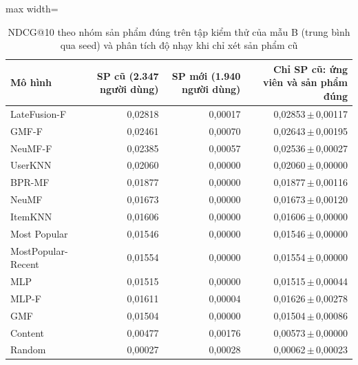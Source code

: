\begin{table}[htbp]
    \centering\small
    \caption{NDCG@10 theo nhóm sản phẩm đúng trên tập kiểm thử của mẫu B (trung bình qua seed) và phân tích độ nhạy khi chỉ xét sản phẩm cũ}
    \label{tab:v2groups}
    \begin{adjustbox}{max width=\textwidth}
    \begin{tabular}{lrrr}
        \toprule
        Mô hình & SP cũ (2.347 người dùng) & SP mới (1.940 người dùng) & Chỉ SP cũ: ứng viên và sản phẩm đúng \\
        \midrule
        LateFusion-F & 0{,}02818 & 0{,}00017 & 0{,}02853\,{\scriptsize$\pm$\,0{,}00117} \\
        GMF-F & 0{,}02461 & 0{,}00070 & 0{,}02643\,{\scriptsize$\pm$\,0{,}00195} \\
        NeuMF-F & 0{,}02385 & 0{,}00057 & 0{,}02536\,{\scriptsize$\pm$\,0{,}00027} \\
        UserKNN & 0{,}02060 & 0{,}00000 & 0{,}02060\,{\scriptsize$\pm$\,0{,}00000} \\
        BPR-MF & 0{,}01877 & 0{,}00000 & 0{,}01877\,{\scriptsize$\pm$\,0{,}00116} \\
        NeuMF & 0{,}01673 & 0{,}00000 & 0{,}01673\,{\scriptsize$\pm$\,0{,}00120} \\
        ItemKNN & 0{,}01606 & 0{,}00000 & 0{,}01606\,{\scriptsize$\pm$\,0{,}00000} \\
        Most Popular & 0{,}01546 & 0{,}00000 & 0{,}01546\,{\scriptsize$\pm$\,0{,}00000} \\
        MostPopular-Recent & 0{,}01554 & 0{,}00000 & 0{,}01554\,{\scriptsize$\pm$\,0{,}00000} \\
        MLP & 0{,}01515 & 0{,}00000 & 0{,}01515\,{\scriptsize$\pm$\,0{,}00044} \\
        MLP-F & 0{,}01611 & 0{,}00004 & 0{,}01626\,{\scriptsize$\pm$\,0{,}00278} \\
        GMF & 0{,}01504 & 0{,}00000 & 0{,}01504\,{\scriptsize$\pm$\,0{,}00086} \\
        Content & 0{,}00477 & 0{,}00176 & 0{,}00573\,{\scriptsize$\pm$\,0{,}00000} \\
        Random & 0{,}00027 & 0{,}00028 & 0{,}00062\,{\scriptsize$\pm$\,0{,}00023} \\
        \bottomrule
    \end{tabular}
    \end{adjustbox}
    \par{}
\end{table}
